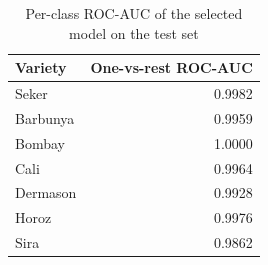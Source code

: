 \begin{table}[htbp]
\centering
\small
\caption{Per-class ROC-AUC of the selected model on the test set}
\label{tab:roc_class}
\begin{tabular}{lr}
\toprule
Variety & One-vs-rest ROC-AUC \\
\midrule
Seker & 0.9982 \\
Barbunya & 0.9959 \\
Bombay & 1.0000 \\
Cali & 0.9964 \\
Dermason & 0.9928 \\
Horoz & 0.9976 \\
Sira & 0.9862 \\
\bottomrule
\end{tabular}
\end{table}
